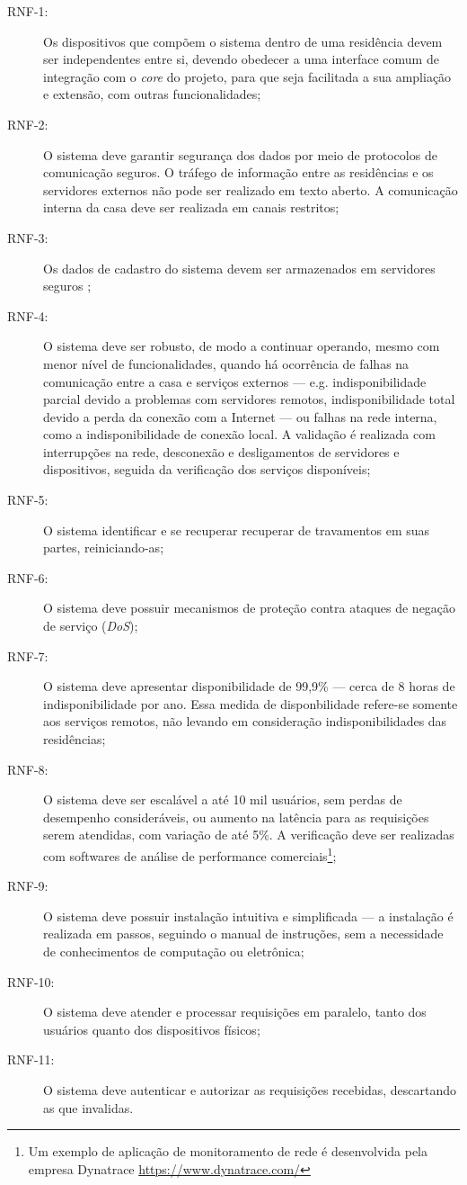 \begin{description}
\item[RNF-1:]  Os dispositivos que compõem o sistema dentro de uma residência devem ser independentes entre si, devendo obedecer a uma interface comum de integração com o \emph{core} do projeto, para que seja facilitada a sua ampliação e extensão, com outras funcionalidades;
\item[RNF-2:]  O sistema deve garantir segurança dos dados por meio de protocolos de comunicação seguros. O tráfego de informação entre as residências e os servidores externos não pode ser realizado em texto aberto. A comunicação interna da casa deve ser realizada em canais restritos;
\item[RNF-3:]  Os dados de cadastro do sistema devem ser armazenados em servidores seguros \cite{softwareSecurity};
\item[RNF-4:]  O sistema deve ser robusto, de modo a continuar operando, mesmo com menor nível de funcionalidades, quando há ocorrência de falhas na comunicação entre a casa e serviços externos --- e.g. indisponibilidade parcial devido a problemas com servidores remotos, indisponibilidade total devido a perda da conexão com a Internet --- ou falhas na rede interna, como a indisponibilidade de conexão local. A validação é realizada com interrupções na rede, desconexão e desligamentos de servidores e dispositivos, seguida da verificação dos serviços disponíveis;
\item[RNF-5:] O sistema identificar e se recuperar recuperar de travamentos em suas partes, reiniciando-as;
\item[RNF-6:] O sistema deve possuir mecanismos de proteção contra ataques de negação de serviço (\emph{DoS});
\item[RNF-7:]  O sistema deve apresentar disponibilidade de 99,9\% --- cerca de 8 horas de indisponibilidade por ano. Essa medida de disponbilidade refere-se somente aos serviços remotos, não levando em consideração indisponibilidades das residências;
\item[RNF-8:]  O sistema deve ser escalável a até 10 mil usuários, sem perdas de desempenho consideráveis, ou aumento na latência para as requisições serem atendidas, com variação de até 5\%. A verificação deve ser realizadas com softwares de análise de performance comerciais\footnote{Um exemplo de aplicação de monitoramento de rede é desenvolvida pela empresa Dynatrace \url{https://www.dynatrace.com/} };
\item[RNF-9:]  O sistema deve possuir instalação intuitiva e simplificada --- a instalação é realizada em passos, seguindo o manual de instruções, sem a necessidade de conhecimentos de computação ou eletrônica;
\item[RNF-10:] O sistema deve atender e processar requisições em paralelo, tanto dos usuários quanto dos dispositivos físicos;
\item[RNF-11:] O sistema deve autenticar e autorizar as requisições recebidas, descartando as que invalidas. 
\end{description}

